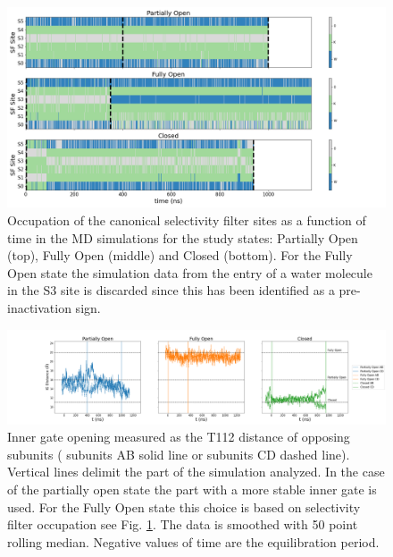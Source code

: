 \documentclass[%
 aip,
 amsmath,amssymb,
 preprint,%
]{revtex4-1}
\newcommand{\ca}{\ce{C_\alpha} }
\begin{document}
\begin{figure}[!htb]
	\includegraphics[width=\textwidth]{figures_SI/SF_occupation_print.png}
	 \caption{\scriptsize
	 Occupation of the canonical selectivity filter sites as a function of time in the MD simulations for the study states:  Partially Open (top), Fully Open (middle) and Closed (bottom). For the Fully Open state the simulation data from the entry of a water molecule in the S3 site is discarded since this has been identified as a pre-inactivation sign. 
}
\label{SI_SF_occupation}
\end{figure}

\begin{figure}[!htb]
	\includegraphics[width=\textwidth]{figures_SI/IG_print.png}
	 \caption{\scriptsize
	 Inner gate opening measured as the  T112 \ca distance of opposing subunits ( subunits AB solid line or subunits CD dashed line). Vertical lines delimit the part of the simulation analyzed. In the case of the partially open state the part with a more stable inner gate is used. For the Fully Open state this choice is based on selectivity filter occupation see Fig. \ref{SI_SF_occupation}. The data is smoothed with 50 point rolling median. Negative values of time are the equilibration period. }
\label{SI_IG}
\end{figure} 
\end{document}
